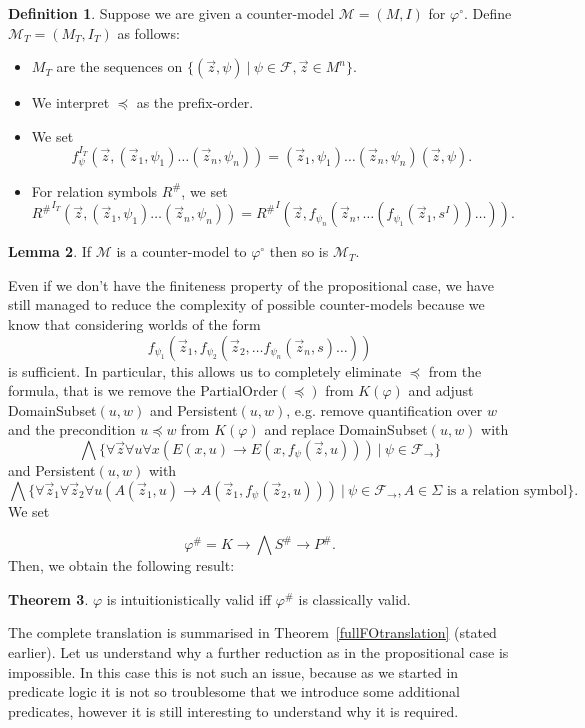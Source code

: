 \documentclass[a4paper,11pt]{report}
\theoremstyle{definition}
\newtheorem{theorem}{Theorem}[section]
\theoremstyle{definition}
\theoremstyle{definition}
\newtheorem{lemma}[theorem]{Lemma}
\theoremstyle{definition}
\theoremstyle{definition}
\newtheorem{definition}[theorem]{Definition}
\theoremstyle{definition}
\theoremstyle{definition}
\begin{document}
	\begin{definition}
		Suppose we are given a counter-model $\mathcal M = (M, I)$ for $\varphi^\circ$. Define $\mathcal M_T = (M_T, I_T)$ as follows:
		\begin{itemize}
			\item $M_T$ are the sequences on $\{(\vec z, \psi)\:|\:\psi\in \mathcal F, \vec z\in M^n\}$.
			\item We interpret $\preceq$ as the prefix-order.
			\item We set $$f_\psi^{I_T}(\vec z, (\vec z_1, \psi_1)\dots (\vec z_n, \psi_n)) = (\vec z_1, \psi_1)\dots (\vec z_n, \psi_n)(\vec z, \psi).$$
			\item For relation symbols $R^\#$, we set $${R^\#}^{I_T}(\vec z, (\vec z_1, \psi_1)\dots (\vec z_n, \psi_n)) = {R^\#}^I(\vec z, f_{\psi_n}(\vec z_n, \dots(f_{\psi_1}(\vec z_1, s^I))\dots)).$$
		\end{itemize}
	\end{definition}
	
	\begin{lemma}
		If $\mathcal M$ is a counter-model to $\varphi^\circ$ then so is $\mathcal M_T$.
	\end{lemma}
	
	Even if we don't have the finiteness property of the propositional case, we have still managed to reduce the complexity of possible counter-models because we know that considering worlds of the form $$f_{\psi_1}(\vec z_1, f_{\psi_2}(\vec z_2, \dots f_{\psi_n}(\vec z_n, s)\dots))$$ is sufficient.
	In particular, this allows us to completely eliminate $\preceq$ from the formula, that is we remove the PartialOrder$(\preceq)$
	from $K(\varphi)$ and adjust DomainSubset$(u, w)$ and Persistent$(u, w)$, e.g. remove quantification over $w$ and the precondition $u\preceq w$ from $K(\varphi)$ and replace DomainSubset$(u, w)$ with
	$$\bigwedge\{\forall \vec z\forall u\forall x(E(x, u)\to E(x, f_\psi(\vec z, u)))\:|\:\psi\in\mathcal F_\to\}$$ and Persistent$(u, w)$ with $$\bigwedge\{\forall\vec z_1\forall\vec z_2\forall u(A(\vec z_1, u)\to A(\vec z_1, f_\psi(\vec z_2, u)))\:|\:\psi\in\mathcal F_\to, \text{$A\in\Sigma$ is a relation symbol}\}.$$ We set
	
	$$\varphi^{\#} = K\to \bigwedge S^\#\to P^\#.$$
	Then, we obtain the following result:
	\begin{theorem}
		\label{thm:fo-reduction}
		$\varphi$ is intuitionistically valid iff $\varphi^\#$ is classically valid.
	\end{theorem}
	The complete translation is summarised in Theorem~\ref{fullFOtranslation} (stated earlier). Let us understand why a further reduction as in the propositional case is impossible. In this case this is not such an issue, because as we started in predicate logic it is not so troublesome that we introduce some additional predicates, however it is still interesting to understand why it is required.
	
\end{document}
